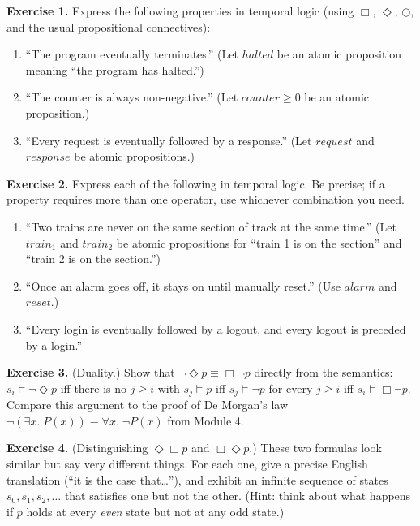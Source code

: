 \documentclass[11pt]{article}
\begin{document}
\bigskip
\textbf{Exercise 1.}\label{ex:temp:1} Express the following properties in temporal logic (using $\Box$, $\Diamond$, $\bigcirc$, and the usual propositional connectives):
\begin{enumerate}[label=(\alph*)]
  \item ``The program eventually terminates.'' (Let $\mathit{halted}$ be an atomic proposition meaning ``the program has halted.'')
  \item ``The counter is always non-negative.'' (Let $\mathit{counter} \geq 0$ be an atomic proposition.)
  \item ``Every request is eventually followed by a response.'' (Let $\mathit{request}$ and $\mathit{response}$ be atomic propositions.)
\end{enumerate}

\bigskip
\textbf{Exercise 2.}\label{ex:temp:2} Express each of the following in temporal logic. Be precise; if a property requires more than one operator, use whichever combination you need.
\begin{enumerate}[label=(\alph*)]
  \item ``Two trains are never on the same section of track at the same time.'' (Let $\mathit{train}_1$ and $\mathit{train}_2$ be atomic propositions for ``train 1 is on the section'' and ``train 2 is on the section.'')
  \item ``Once an alarm goes off, it stays on until manually reset.'' (Use $\mathit{alarm}$ and $\mathit{reset}$.)
  \item ``Every login is eventually followed by a logout, and every logout is preceded by a login.''
\end{enumerate}

\bigskip
\textbf{Exercise 3.}\label{ex:temp:3} (Duality.) Show that $\lnot \Diamond p \equiv \Box \lnot p$ directly from the semantics: $s_i \models \lnot \Diamond p$ iff there is no $j \geq i$ with $s_j \models p$ iff $s_j \models \lnot p$ for every $j \geq i$ iff $s_i \models \Box \lnot p$. Compare this argument to the proof of De Morgan's law $\lnot (\exists x.\; P(x)) \equiv \forall x.\; \lnot P(x)$ from Module 4.

\bigskip
\textbf{Exercise 4.}\label{ex:temp:4} (Distinguishing $\Diamond \Box p$ and $\Box \Diamond p$.) These two formulas look similar but say very different things. For each one, give a precise English translation (``it is the case that\ldots''), and exhibit an infinite sequence of states $s_0, s_1, s_2, \ldots$ that satisfies one but not the other. (Hint: think about what happens if $p$ holds at every \emph{even} state but not at any odd state.)
\end{document}
